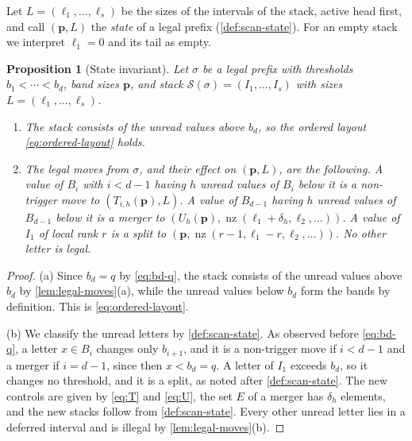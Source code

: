 \documentclass[11pt,reqno]{amsart}
\newtheorem{proposition}[proposition]{Proposition}
\theoremstyle{definition}
\theoremstyle{remark}
\newcommand{\nz}{\operatorname{nz}}
\begin{document}
Let $L=(\ell_1,\ldots,\ell_s)$ be the sizes of the intervals of the stack,
active head first, and call $(\mathbf p,L)$ the \emph{state} of a legal
prefix (\cref{def:scan-state}).  For an empty stack
we interpret $\ell_1=0$ and its tail as empty.

\begin{proposition}[State invariant]\label{prop:state-invariant}
Let $\sigma$ be a legal prefix with thresholds $b_1<\cdots<b_d$, band sizes
$\mathbf p$, and stack $\mathcal S(\sigma)=(I_1,\ldots,I_s)$ with sizes
$L=(\ell_1,\ldots,\ell_s)$.
\begin{enumerate}
\item[(a)] The stack consists of the unread values above $b_d$, so the
  ordered layout \eqref{eq:ordered-layout} holds.
\item[(b)] The legal moves from $\sigma$, and their effect on
  $(\mathbf p,L)$, are the following.  A value of $B_i$ with $i<d-1$ having
  $h$ unread values of $B_i$ below it is a non-trigger move to
  $(T_{i,h}(\mathbf p),L)$.  A value of $B_{d-1}$ having $h$ unread values of
  $B_{d-1}$ below it is a merger to
  $(U_h(\mathbf p),\nz(\ell_1+\delta_h,\ell_2,\ldots))$.  A value of $I_1$
  of local rank $r$ is a split to
  $(\mathbf p,\nz(r-1,\ell_1-r,\ell_2,\ldots))$.  No other letter is legal.
\end{enumerate}
\end{proposition}

\begin{proof}
(a) Since $b_d=q$ by \eqref{eq:bd-q}, the stack consists of the unread
values above $b_d$ by \cref{lem:legal-moves}(a), while the unread values
below $b_d$ form the bands by definition.  This is \eqref{eq:ordered-layout}.

(b) We classify the unread letters by \cref{def:scan-state}.  As observed
before \eqref{eq:bd-q}, a letter $x\in B_i$ changes only $b_{i+1}$, and it
is a non-trigger move if $i<d-1$ and a merger if $i=d-1$, since then
$x<b_d=q$.  A letter of $I_1$ exceeds $b_d$, so it changes no threshold, and
it is a split, as noted after \cref{def:scan-state}.  The new controls are
given by \eqref{eq:T} and \eqref{eq:U}, the set $E$ of a merger has
$\delta_h$ elements, and the new stacks follow from \cref{def:scan-state}.
Every other unread letter lies in a deferred interval and is illegal by
\cref{lem:legal-moves}(b).
\end{proof}
\end{document}
